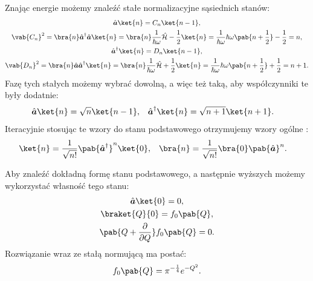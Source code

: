 Znając energie możemy znaleźć stałe normalizacyjne sąsiednich stanów:
\begin{gather*}
	\vu{a} \ket{n} = C_n \ket{n-1}, \\
	\vab{C_n}^2 = \bra{n} \vu{a}^{\dagger}\vu{a} \ket{n} =
	\bra{n} \inv{\hbar\omega}\ham - \inv{2} \ket{n} =
	\inv{\hbar\omega} \hbar\omega \pab{n + \inv{2}} - \inv{2} = n, \\
	\vu{a}^{\dagger} \ket{n} = D_n \ket{n-1}, \\
	\vab{D_n}^2 = \bra{n} \vu{a}\vu{a}^{\dagger} \ket{n} =
	\bra{n} \inv{\hbar\omega}\ham + \inv{2} \ket{n} =
	\inv{\hbar\omega} \hbar\omega \pab{n + \inv{2}} + \inv{2} = n + 1.
\end{gather*}
Fazę tych stałych możemy wybrać dowolną, a więc też taką, aby współczynniki te były dodatnie:
\begin{align*}
	\vu{a} \ket{n} &= \sqrt{n} \ket{n - 1}, &
	\vu{a}^{\dagger} \ket{n} &= \sqrt{n + 1} \ket{n + 1}.
\end{align*}
Iteracyjnie stosując te wzory do stanu podstawowego otrzymujemy wzory ogólne \cite{Louisell}:
\begin{align*}
	\ket{n} &= \inv{\sqrt{n!}} \pab{\vu{a}^{\dagger}}^n \ket{0}, &
	\bra{n} &= \inv{\sqrt{n!}} \bra{0} \pab{\vu{a}}^n.
\end{align*}

Aby znaleźć dokładną formę stanu podstawowego, a następnie wyższych możemy wykorzystać własność tego stanu:
\begin{gather*}
	\vu{a} \ket{0} = 0, \\
	\braket{Q}{0} = f_{0}\pab{Q}, \\
	\pab{Q + \pdv{}{Q}} f_{0}\pab{Q} = 0.
\end{gather*}
Rozwiązanie wraz ze stałą normującą ma postać:
\begin{equation}\label{eq:osc_harm_stan_podst}
	f_{0} \pab{Q} = \pi^{-\frac{1}{4}} e^{-Q^2}.
\end{equation}

